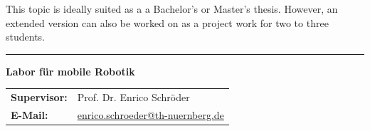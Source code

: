 \documentclass{ohm_project_description}
\begin{document}
\vspace{0.5cm}
This topic is ideally suited as a a Bachelor's or Master's thesis. However, an extended version can also be worked on as a project work for two to three students.


\vfill
\textcolor{ohm_red}{\rule{\linewidth}{0.4mm}}
\textbf{\textcolor{ohm_red}{Labor für mobile Robotik}} \\
\begin{tabular}{@{}ll}
\textbf{Supervisor:} & Prof. Dr. Enrico Schröder \\
\textbf{E-Mail:}   & \href{mailto:enrico.schroeder@th-nuernberg.de}{enrico.schroeder@th-nuernberg.de} \\
\end{tabular}
\end{document}
